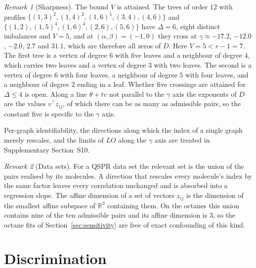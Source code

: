 \documentclass[a5paper, 10pt]{article}
\theoremstyle{plain}
\theoremstyle{remark}
\newtheorem*{remark}{Remark}
\theoremstyle{definition}
\begin{document}
  \begin{remark}[Sharpness]\label{rem:crossings}
  The bound $V$ is attained. The trees of order $12$ with profiles
  $\{(1,3)^{2},\allowbreak (1,4)^{2},\allowbreak (1,6)^{5},\allowbreak (3,4),\allowbreak (4,6)\}$
  and
  $\{(1,2),\allowbreak (1,5)^{4},\allowbreak (1,6)^{4},\allowbreak (2,6),\allowbreak (5,6)\}$
  have $\Delta = 6$, eight distinct imbalances and $V = 5$, and at
  $(\alpha,\beta) = (-1,0)$ they cross at $\gamma \approx -17.2$,
  $-12.0$, $-2.0$, $2.7$ and $31.1$, which are therefore all zeros of
  $D$. Here $V = 5 < r - 1 = 7$. The first tree is a vertex of degree $6$ with five leaves and a
  neighbour of degree $4$, which carries two leaves and a vertex of
  degree $3$ with two leaves. The second is a vertex of degree $6$ with
  four leaves, a neighbour of degree $5$ with four leaves, and a
  neighbour of degree $2$ ending in a leaf. Whether five crossings are
  attained for $\Delta \le 4$ is open. Along a line
  $\theta + t v$ not parallel to the $\gamma$ axis the exponents of $D$
  are the values $v^{\top} z_{ij}$, of which there can be as many as
  admissible pairs, so the constant five is specific to the $\gamma$
  axis.
  \end{remark}

  Per-graph identifiability, the directions along which the index of a
  single graph merely rescales, and the limits of $LO$ along the
  $\gamma$ axis are treated in Supplementary Section~S10.

  \begin{remark}[Data sets]\label{rem:dataset}
  For a QSPR data set the relevant set is the union of the pairs
  realised by its molecules. A direction that rescales every
  molecule's index by the same factor leaves every correlation
  unchanged and is absorbed into a regression slope. The affine dimension of a set of vectors $z_{ij}$ is the dimension of
  the smallest affine subspace of $\mathbb{R}^3$ containing them. On the
  octanes this union contains nine of the ten admissible pairs and its affine
  dimension is $3$, so the octane fits of
  Section~\ref{sec:sensitivity} are free of exact confounding of this
  kind.
  \end{remark}

\section{Discrimination}\label{sec:discrimination}
\end{document}
